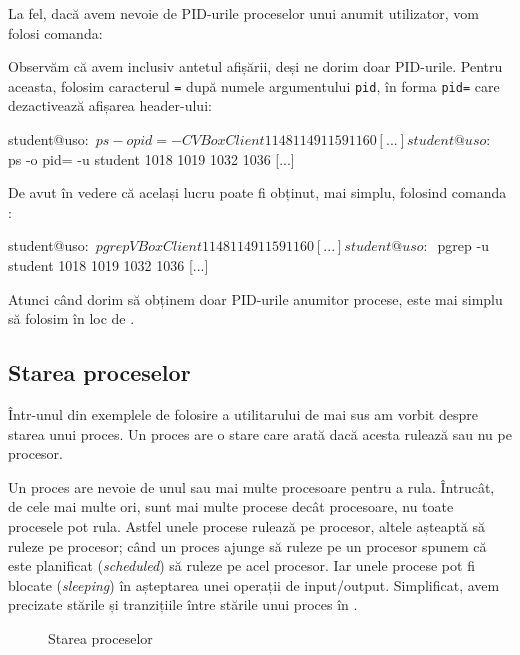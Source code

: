La fel, dacă avem nevoie de PID-urile proceselor unui anumit utilizator, vom folosi comanda:


Observăm că avem inclusiv antetul afișării, deși ne dorim doar PID-urile.
Pentru aceasta, folosim caracterul \texttt{=} după numele argumentului \texttt{pid}, în forma \texttt{pid=} care dezactivează afișarea header-ului:

\begin{screen}
student@uso:~$ ps -o pid= -C VBoxClient
 1148
 1149
 1159
 1160
[...]
student@uso:~$ ps -o pid= -u student
 1018
 1019
 1032
 1036
[...]
\end{screen}

De avut în vedere că același lucru poate fi obținut, mai simplu, folosind comanda :

\begin{screen}
student@uso:~$ pgrep VBoxClient
1148
1149
1159
1160
[...]
student@uso:~$ pgrep -u student
1018
1019
1032
1036
[...]
\end{screen}

Atunci când dorim să obținem doar PID-urile anumitor procese, este mai simplu să folosim  în loc de .

\subsection{Starea proceselor}
\label{sec:process:state}

Într-unul din exemplele de folosire a utilitarului  de mai sus am vorbit despre starea unui proces.
Un proces are o stare care arată dacă acesta rulează sau nu pe procesor.

Un proces are nevoie de unul sau mai multe procesoare pentru a rula.
Întrucât, de cele mai multe ori, sunt mai multe procese decât procesoare, nu toate procesele pot rula.
Astfel unele procese rulează pe procesor, altele așteaptă să ruleze pe procesor;
când un proces ajunge să ruleze pe un procesor spunem că este planificat (\textit{scheduled}) să ruleze pe acel procesor.
Iar unele procese pot fi blocate (\textit{sleeping}) în așteptarea unei operații de input/output.
Simplificat, avem precizate stările și tranzițiile între stările unui proces în .

\begin{figure}[!htbp]
  \centering
  \def\svgwidth{0.8\textwidth}
  
  \caption{Starea proceselor}
  \label{fig:process:state}
\end{figure}

